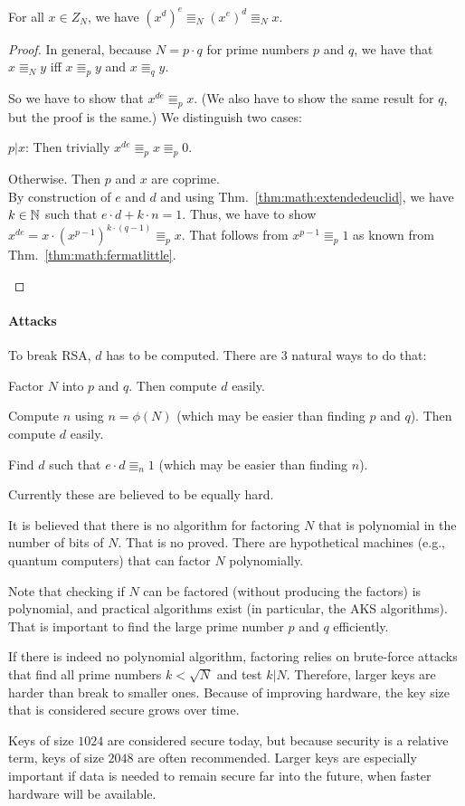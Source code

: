 \begin{theorem}
For all $x\in Z_N$, we have $(x^d)^e\Equiv_N (x^e)^d \Equiv_N x$.
\end{theorem}
\begin{proof}
In general, because $N=p\cdot q$ for prime numbers $p$ and $q$, we have that $x\Equiv_N y$ iff $x\Equiv_p y$ and $x\Equiv_q y$.

So we have to show that $x^{de}\Equiv_p x$.
(We also have to show the same result for $q$, but the proof is the same.)
We distinguish two cases:
\begin{compactitem}
\item $p|x$: Then trivially $x^{de}\Equiv_p x\Equiv_p 0$.
\item Otherwise. Then $p$ and $x$ are coprime.\\
   By construction of $e$ and $d$ and using Thm.~\ref{thm:math:extendedeuclid}, we have $k\in\mathbb{N}$ such that $e\cdot d+k\cdot n=1$.
   Thus, we have to show $x^{de}=x\cdot (x^{p-1})^{k\cdot(q-1)}\Equiv_p x$.
   That follows from $x^{p-1}\Equiv_p 1$ as known from Thm.~\ref{thm:math:fermatlittle}.
\end{compactitem}
\end{proof}

\paragraph{Attacks}
To break RSA, $d$ has to be computed.
There are $3$ natural ways to do that:
\begin{compactitem}
 \item Factor $N$ into $p$ and $q$. Then compute $d$ easily.
 \item Compute $n$ using $n=\phi(N)$ (which may be easier than finding $p$ and $q$). Then compute $d$ easily.
 \item Find $d$ such that $e\cdot d\Equiv_n 1$ (which may be easier than finding $n$).
\end{compactitem}
Currently these are believed to be equally hard.

It is believed that there is no algorithm for factoring $N$ that is polynomial in the number of bits of $N$.
That is no proved.
There are hypothetical machines (e.g., quantum computers) that can factor $N$ polynomially.

Note that checking if $N$ can be factored (without producing the factors) is polynomial, and practical algorithms exist (in particular, the AKS algorithms).
That is important to find the large prime number $p$ and $q$ efficiently.
\medskip

If there is indeed no polynomial algorithm, factoring relies on brute-force attacks that find all prime numbers $k<\sqrt{N}$ and test $k|N$.
Therefore, larger keys are harder than break to smaller ones.
Because of improving hardware, the key size that is considered secure grows over time.

Keys of size $1024$ are considered secure today, but because security is a relative term, keys of size $2048$ are often recommended.
Larger keys are especially important if data is needed to remain secure far into the future, when faster hardware will be available.